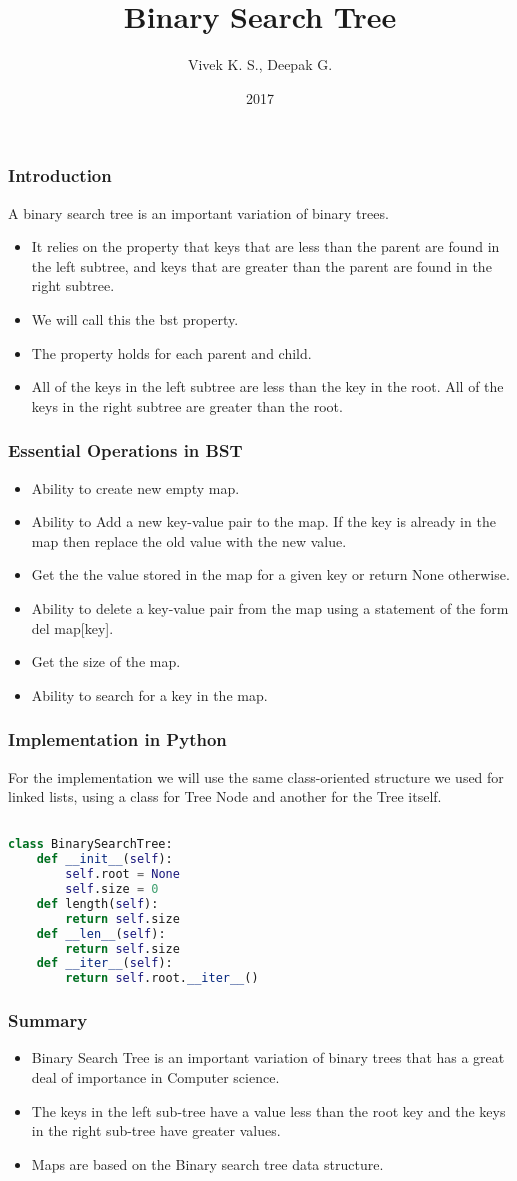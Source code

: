 \documentclass{beamer}
\title{Binary Search Tree}
\author{Vivek K. S., Deepak G.}
\institute{Information Systems Decision Sciences (ISDS)\\
MUMA College of Business\\
University of South Florida \\
Tampa, Florida}
\date{2017}
\begin{document}
\frame{\titlepage}
\begin{frame}
\frametitle{Introduction}
A binary search tree is an important variation of binary trees.
\begin{itemize}
\item It relies on the property that keys that are less than the parent are found in the left subtree, and keys that are greater than the parent are found in the right subtree. 
\item We will call this the bst property.
\item The property holds for each parent and child. 
\item All of the keys in the left subtree are less than the key in the root. All of the keys in the right subtree are greater than the root.
\end{itemize}
\end{frame}

\begin{frame}
\frametitle{Essential Operations in BST}
\begin{itemize}
\item Ability to create new empty map.
\item Ability to Add a new key-value pair to the map. If the key is already in the map then replace the old value with the new value.
\item Get the the value stored in the map for a given key or return None otherwise.
\item Ability to delete a key-value pair from the map using a statement of the form del map[key].
\item Get the size of the map.
\item Ability to search for a key in the map.
\end{itemize}
\end{frame}

\begin{frame}[fragile]
\frametitle{Implementation in Python}
For the implementation we will use the same class-oriented structure we used for linked lists, using a class for Tree Node and another for the Tree itself.
\begin{lstlisting}[language=Python]

class BinarySearchTree:
    def __init__(self):
        self.root = None
        self.size = 0
    def length(self):
        return self.size
    def __len__(self):
        return self.size
    def __iter__(self):
        return self.root.__iter__()
\end{lstlisting}
\end{frame}

\begin{frame}
\frametitle{Summary}
\begin{itemize}
\item Binary Search Tree is an important variation of binary trees that has a great deal of importance in Computer science.
\item The keys in the left sub-tree have a value less than the root key and the keys in the right sub-tree have greater values.
\item Maps are based on the Binary search tree data structure.
\end{itemize}
\end{frame}
\end{document}
